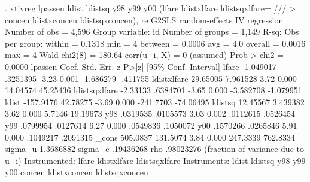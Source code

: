 . xtivreg lpassen ldist ldistsq y98 y99 y00 (lfare ldistxlfare ldistsqxlfare= ///
> concen ldistxconcen ldistsqxconcen), re
{\smallskip}
G2SLS random-effects IV regression              Number of obs     =      4,596
Group variable: id                              Number of groups  =      1,149
{\smallskip}
R-sq:                                           Obs per group:
     within  = 0.1318                                         min =          4
     between = 0.0006                                         avg =        4.0
     overall = 0.0016                                         max =          4
{\smallskip}
                                                Wald chi2(8)      =     180.64
corr(u_i, X)       = 0 (assumed)                Prob > chi2       =     0.0000
{\smallskip}
      lpassen {\VBAR}      Coef.   Std. Err.      z    P>|z|     [95\% Conf. Interval]
        lfare {\VBAR}  -1.049017   .3251395    -3.23   0.001    -1.686279    -.411755
  ldistxlfare {\VBAR}   29.65005   7.961528     3.72   0.000     14.04574    45.25436
ldistsqxlfare {\VBAR}   -2.33133   .6384701    -3.65   0.000    -3.582708   -1.079951
        ldist {\VBAR}  -157.9176   42.78275    -3.69   0.000    -241.7703   -74.06495
      ldistsq {\VBAR}   12.45567   3.439382     3.62   0.000       5.7146    19.19673
          y98 {\VBAR}   .0319535   .0105573     3.03   0.002     .0112615    .0526454
          y99 {\VBAR}   .0799954   .0127614     6.27   0.000     .0549836    .1050072
          y00 {\VBAR}   .1570266   .0265846     5.91   0.000     .1049217    .2091315
        _cons {\VBAR}   505.0837   131.5074     3.84   0.000     247.3339    762.8334
      sigma_u {\VBAR}  1.3686882
      sigma_e {\VBAR}  .19436268
          rho {\VBAR}  .98023276   (fraction of variance due to u_i)
Instrumented:   lfare ldistxlfare ldistsqxlfare
Instruments:    ldist ldistsq y98 y99 y00 concen ldistxconcen ldistsqxconcen
{\smallskip}
